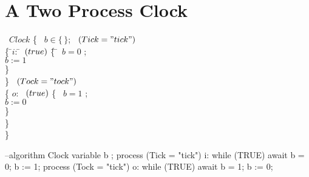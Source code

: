 \documentclass[fleqn,leqno]{article}
\begin{document}
\section*{A Two Process Clock}

\begin{twocols}
\begin{tabbing}
\algorithm\ $Clock$ \{  
\variable\ $b \in \{\,\}$;
\process\ $(Tick = "tick")$\\
\{ \=$i$: \=\pwhile\ $(\TRUE)$ \= \{ \= \await\ $b=0$ ; \\
        \>      \>                  \>    \> $b := 1$\\
        \>      \>                  \>  \} \\
\} 
\process\ $(Tock = "tock")$\\
\{ \> $o$: \>\pwhile\ $(\TRUE)$ \> \{ \> \await\ $b=1$ ; \\
        \>      \>                   \>    \>  $ b := 0$\\
        \>      \>                   \>  \}\\
\} \\
\}
\end{tabbing}
\midcol
\begin{verbatim*}
--algorithm Clock {
  variable b  ;
  process (Tick = "tick") 
    { i: while (TRUE) { await b = 0;
                        b := 1;
                      }
    }
  process (Tock = "tick") 
    { o: while (TRUE) { await b = 1;
                        b := 0;
                      }
    }
}
\end{verbatim*}
\end{twocols}
\end{document}

